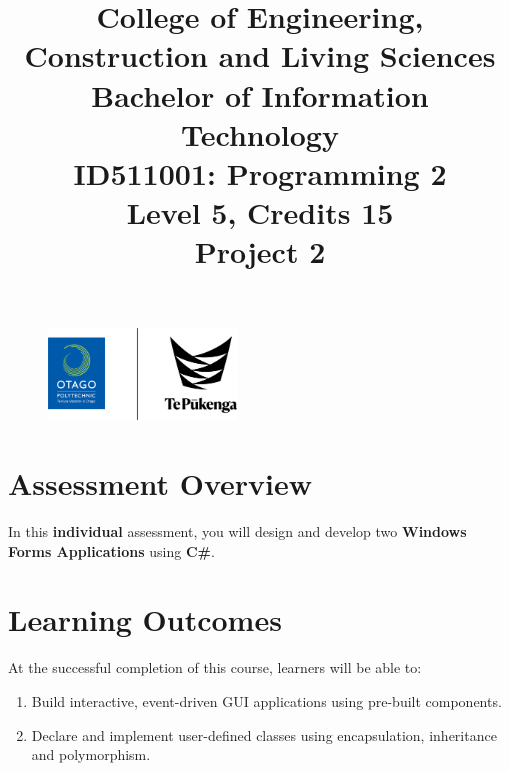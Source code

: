\documentclass{article}
\author{}
\begin{document}
\begin{figure}
    \centering
    \includegraphics[width=50mm]{../../resources/img/logo.png}
\end{figure}

\title{College of Engineering, Construction and Living Sciences\\Bachelor of Information Technology\\ID511001: Programming 2\\Level 5, Credits 15\\\textbf{Project 2}}
\date{}
\maketitle

\section*{Assessment Overview}
In this \textbf{individual} assessment, you will design and develop two \textbf{Windows Forms Applications} using \textbf{C\#}. 

\section*{Learning Outcomes}
At the successful completion of this course, learners will be able to:
\begin{enumerate}
    \item Build interactive, event-driven GUI applications using pre-built components.
    \item Declare and implement user-defined classes using encapsulation, inheritance and polymorphism.
\end{enumerate}
\end{document}
